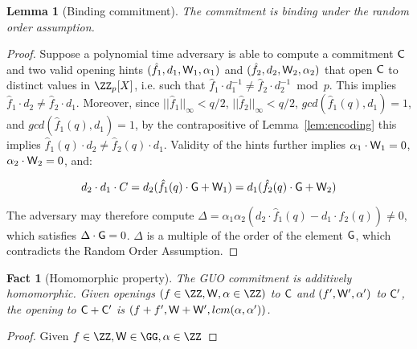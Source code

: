 \documentclass[12pt]{article}
\theoremstyle{Definition}
\newtheorem{lemma}{Lemma}
\newtheorem{fact}{Fact}
\begin{document}
\begin{lemma}[Binding commitment]
\label{lem:aug-com-binding}
	The commitment is binding under the random order assumption. 
\end{lemma}
\begin{proof}
	Suppose a polynomial time adversary is able to compute a commitment $\mathsf{C}$ and two valid opening hints $(\hat{f}_1, d_1, \mathsf{W}_1, \alpha_1)$ and $(\hat{f}_2, d_2, \mathsf{W}_2, \alpha_2)$ that open $\mathsf{C}$ to distinct values in $\ZZ_p[X]$, i.e. such that $\hat{f}_1 \cdot d_1^{-1} \neq \hat{f}_2 \cdot d_2^{-1} \bmod p$. This implies $\hat{f}_1 \cdot d_2 \neq \hat{f}_2 \cdot d_1$. Moreover, since $||\hat{f}_1||_\infty < q/2$, $||\hat{f}_2||_\infty < q/2$, $gcd(\hat{f}_1(q), d_1) = 1$, and $gcd(\hat{f}_1(q), d_1) = 1$, by the contrapositive of Lemma~\ref{lem:encoding} this implies $\hat{f}_1(q) \cdot d_2 \neq \hat{f}_2(q) \cdot d_1$. Validity of the hints further implies $\alpha_1 \cdot \mathsf{W}_1 = 0$, $\alpha_2 \cdot \mathsf{W}_2 = 0$, and: 
	
	$$d_2 \cdot d_1 \cdot C = d_2 (\hat{f}_1(q) \cdot \mathsf{G} + \mathsf{W}_1) = d_1(\hat{f}_2(q) \cdot \mathsf{G} + \mathsf{W}_2)$$
	
	The adversary may therefore compute $\Delta = \alpha_1 \alpha_2 (d_2 \cdot \hat{f}_1(q)  - d_1 \cdot \hat{f}_2(q)) \neq 0$, which satisfies $\Delta \cdot \mathsf{G} = 0$. $\Delta$ is a multiple of the order of the element $\mathsf{G}$, which contradicts the Random Order Assumption. 
	 
	\end{proof}
	
	\begin{fact}[Homomorphic property]
		The GUO commitment is additively homomorphic. Given openings $(f \in \ZZ,\gr{W},\alpha \in \ZZ)$ to $\mathsf{C}$ and $(f',\mathsf{W}',\alpha')$ to $\mathsf{C}'$, the opening to $\mathsf{C} + \mathsf{C}'$ is $(f + f', \mathsf{W} + \mathsf{W}', lcm(\alpha, \alpha'))$.  \end{fact}
	\begin{proof}
		Given $f \in \ZZ,\gr{W} \in \GG, \alpha \in \ZZ$
	\end{proof}
	
\end{document}
